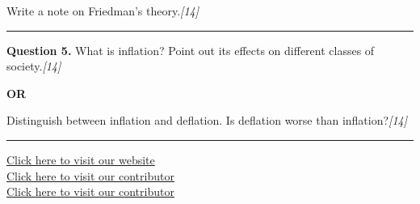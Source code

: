 \documentclass[11pt,a4paper]{article}
\newcommand{\pts}[1]{\hfill   \textit{[#1]}}
\begin{document}
Write a note on Friedman's theory.\pts{14}

\medskip\rule{\linewidth}{0.2pt}




\noindent   \textbf{Question 5.}
What is inflation? Point out its effects on different classes of society.\pts{14}

\centerline{   \textbf{OR}}

Distinguish between inflation and deflation. Is deflation worse than inflation?\pts{14}

\vfill
\rule{\linewidth}{0.4pt}

\begin{center}\small
\href{https://bhu-exam.vercel.app/}{Click here to visit our website}\\[4pt]
\href{https://me-aryan.vercel.app/}{Click here to visit our contributor}\\[4pt]
\href{https://quashan-me.vercel.app/}{Click here to visit our contributor}
\end{center}
\end{document}
